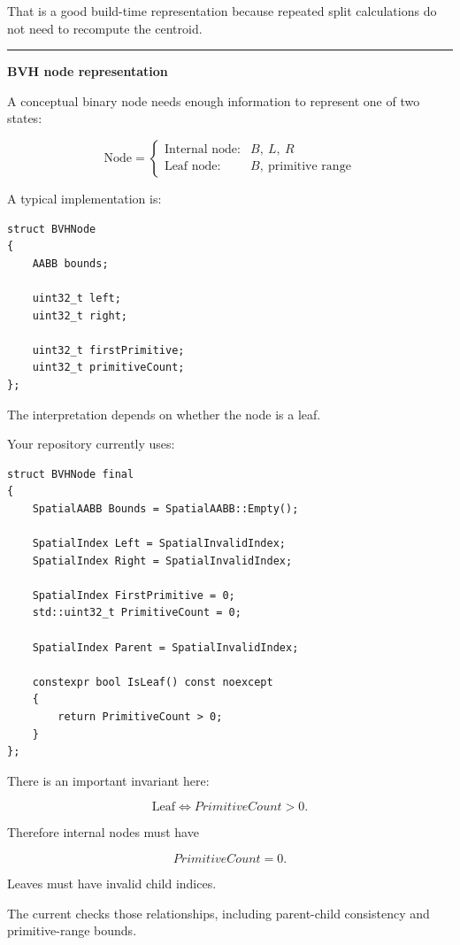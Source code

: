 That is a good build-time representation because repeated split calculations do not need to recompute the centroid.

\begin{center}\rule{0.5\linewidth}{0.5pt}\end{center}

\textbf{BVH node representation}

A conceptual binary node needs enough information to represent one of two states:

\[
\text{Node}
=
\begin{cases}
\text{Internal node}:& B,\ L,\ R\\[2mm]
\text{Leaf node}:& B,\ \text{primitive range}
\end{cases}
\]

A typical implementation is:

\begin{verbatim}
struct BVHNode
{
    AABB bounds;

    uint32_t left;
    uint32_t right;

    uint32_t firstPrimitive;
    uint32_t primitiveCount;
};
\end{verbatim}

The interpretation depends on whether the node is a leaf.

Your repository currently uses:

\begin{verbatim}
struct BVHNode final
{
    SpatialAABB Bounds = SpatialAABB::Empty();

    SpatialIndex Left = SpatialInvalidIndex;
    SpatialIndex Right = SpatialInvalidIndex;

    SpatialIndex FirstPrimitive = 0;
    std::uint32_t PrimitiveCount = 0;

    SpatialIndex Parent = SpatialInvalidIndex;

    constexpr bool IsLeaf() const noexcept
    {
        return PrimitiveCount > 0;
    }
};
\end{verbatim}

There is an important invariant here:

\[
\text{Leaf}\iff PrimitiveCount>0.
\]

Therefore internal nodes must have

\[
PrimitiveCount=0.
\]

Leaves must have invalid child indices.

The current  checks those relationships, including parent-child consistency and primitive-range bounds.

